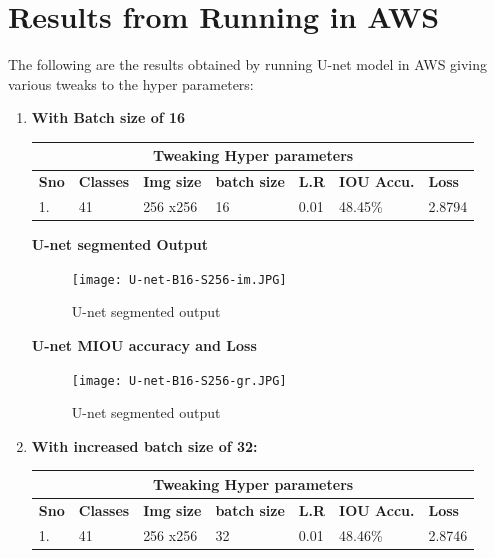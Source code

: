 \documentclass{IEEEtran}
\begin{document}
\section{\textbf{Results from Running in AWS}}

The following are the results obtained by running U-net model in AWS giving various tweaks to the hyper parameters:

\begin{enumerate}
    \item \textbf{With Batch size of 16}
\newline

\begin{tabular}{ |p{0.6cm}|p{1.2cm}|p{0.6cm}|p{0.6cm}|p{0.6cm}|p{0.8cm}|p{0.8cm}|}
 \hline
 \multicolumn{7}{|c|}{\textbf{Tweaking Hyper parameters}} \\
 \hline
 \textbf{Sno} & \textbf{Classes} & \textbf{Img size} & \textbf{batch size} & \textbf{L.R} & \textbf{IOU Accu.} & \textbf{Loss} \\
 \hline
 1. & 41   & 256 x256    & 16  & 0.01 & 48.45\% & 2.8794 \\
 \hline
\end{tabular}

\newpage
\textbf{U-net segmented Output}

\begin{figure}[h]
    \centering
    \captionsetup{justification=centering}
    \texttt{[image: U-net-B16-S256-im.JPG]}
    \caption{U-net segmented output}
    \label{fig:Binary class segmented output}
\end{figure}

\textbf{U-net MIOU accuracy and Loss}

\begin{figure}[h]
    \centering
    \captionsetup{justification=centering}
    \texttt{[image: U-net-B16-S256-gr.JPG]}
    \caption{U-net segmented output}
    \label{fig:Binary class segmented output}
\end{figure}

\item \textbf{With increased batch size of 32:}
\newline
\begin{tabular}{ |p{0.6cm}|p{1.2cm}|p{0.6cm}|p{0.6cm}|p{0.6cm}|p{0.8cm}|p{0.8cm}|}
 \hline
 \multicolumn{7}{|c|}{\textbf{Tweaking Hyper parameters}} \\
 \hline
 \textbf{Sno} & \textbf{Classes} & \textbf{Img size} & \textbf{batch size} & \textbf{L.R} & \textbf{IOU Accu.} & \textbf{Loss} \\
 \hline
 1. & 41   & 256 x256    & 32  & 0.01 & 48.46\% & 2.8746 \\
 \hline
\end{tabular}
\newline


\end{enumerate}
\end{document}
